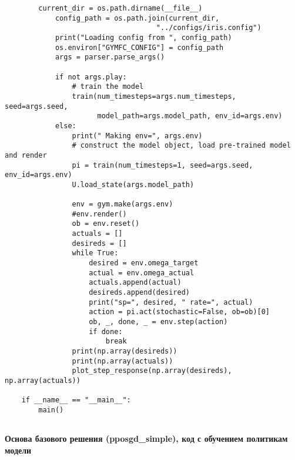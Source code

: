 \begin{verbatim}
        current_dir = os.path.dirname(__file__)
            config_path = os.path.join(current_dir,
                                    "../configs/iris.config")
            print("Loading config from ", config_path)
            os.environ["GYMFC_CONFIG"] = config_path
            args = parser.parse_args()

            if not args.play:
                # train the model
                train(num_timesteps=args.num_timesteps, seed=args.seed, 
                      model_path=args.model_path, env_id=args.env)
            else:
                print(" Making env=", args.env)
                # construct the model object, load pre-trained model and render
                pi = train(num_timesteps=1, seed=args.seed, env_id=args.env)
                U.load_state(args.model_path)

                env = gym.make(args.env)
                #env.render()
                ob = env.reset()
                actuals = []
                desireds = []
                while True:
                    desired = env.omega_target
                    actual = env.omega_actual
                    actuals.append(actual)
                    desireds.append(desired)
                    print("sp=", desired, " rate=", actual)
                    action = pi.act(stochastic=False, ob=ob)[0]
                    ob, _, done, _ = env.step(action)
                    if done:
                        break
                print(np.array(desireds))
                print(np.array(actuals))
                plot_step_response(np.array(desireds), np.array(actuals))

    if __name__ == "__main__":
        main()


\end{verbatim}

\textbf{Основа базового решения (pposgd\_simple), код с обучением политикам модели}

